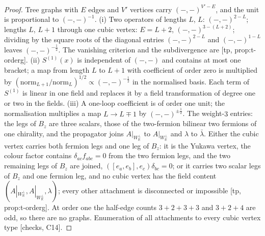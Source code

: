 \documentclass[11pt]{report}
\theoremstyle{plain}
\theoremstyle{definition}
\numberwithin{equation}{chapter}
\newcommand{\Wp}{W_{\mathbb R}^\perp}
\begin{document}
\begin{proof}
Tree graphs with $E$ edges and $V'$ vertices carry $(-,-)^{V'-E}$, and the unit is proportional to $(-,-)^{-1}$. (i) Two operators of lengths $L$, $L$: $(-,-)^{2-L}$; lengths $L$, $L+1$ through one cubic vertex: $E=L+2$, $(-,-)^{3-(L+2)}$; dividing by the square roots of the diagonal entries $(-,-)^{2-L}$ and $(-,-)^{1-L}$ leaves $(-,-)^{-\frac12}$. The vanishing criterion and the subdivergence are [tp, prop:t-orderg]. (ii) $S^{(1)}(x)$ is independent of $(-,-)$ and contains at most one bracket; a map from length $L$ to $L+1$ with coefficient of order zero is multiplied by $(\text{norm}_{L+1}/\text{norm}_L)^{1/2}\propto(-,-)^{-\frac12}$ in the normalised basis. Each term of $S^{(1)}$ is linear in one field and replaces it by a field transformation of degree one or two in the fields. (iii) A one-loop coefficient is of order one unit; the normalisation multiplies a map $L\to L\mp1$ by $(-,-)^{\pm\frac12}$. The weight-$3$ entries: the legs of $B_z$ are three scalars, those of the two-fermion bilinear two fermions of one chirality, and the propagator joins $A|_{\Wp}$ to $A|_{\Wp}$ and $\lambda$ to $\bar\lambda$. Either the cubic vertex carries both fermion legs and one leg of $B_z$: it is the Yukawa vertex, the colour factor contains $\delta_{ac}f_{abc}=0$ from the two fermion legs, and the two remaining legs of $B_z$ are joined, $([e_a,e_b],e_c)\delta_{bc}=0$; or it carries two scalar legs of $B_z$ and one fermion leg, and no cubic vertex has the field content $(A|_{\Wp},A|_{\Wp},\lambda)$; every other attachment is disconnected or impossible [tp, prop:t-orderg]. At order one the half-edge counts $3+2+3+3$ and $3+2+4$ are odd, so there are no graphs. Enumeration of all attachments to every cubic vertex type [checks, C14].
\end{proof}
\end{document}
